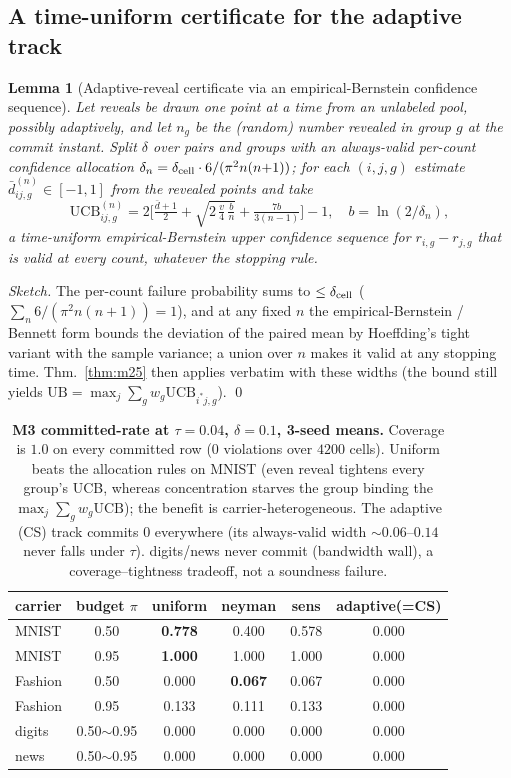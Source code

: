 \documentclass{article}
\newtheorem{lemma}{Lemma}
\begin{document}
\subsection{A time-uniform certificate for the adaptive track}
\begin{lemma}[Adaptive-reveal certificate via an empirical-Bernstein confidence sequence]
\label{lem:cs}
Let reveals be drawn one point at a time from an unlabeled pool, possibly adaptively, and let
$n_g$ be the (random) number revealed in group $g$ at the commit instant. Split $\delta$
over pairs and groups with an always-valid per-count confidence allocation
$\delta_n = \delta_{\rm cell}\cdot 6/(\pi^2 n(n{+}1))$; for each $(i,j,g)$ estimate
$\bar d_{ij,g}^{(n)}\in[-1,1]$ from the revealed points and take
\[
  \mathrm{UCB}^{(n)}_{ij,g} = 2\Big[\tfrac{\bar d+1}{2}+\sqrt{2\,\tfrac{v}{4}\,\tfrac{b}{n}}
    + \tfrac{7b}{3(n-1)}\Big]-1,\quad b=\ln(2/\delta_n),
\]
a time-uniform empirical-Bernstein upper confidence sequence for $r_{i,g}-r_{j,g}$ that is
valid \emph{at every count, whatever the stopping rule}.
\end{lemma}
\begin{proof}[Sketch]
The per-count failure probability sums to $\le \delta_{\rm cell}$
($\sum_n 6/(\pi^2 n(n{+}1))=1$), and at any fixed $n$ the empirical-Bernstein / Bennett form
bounds the deviation of the paired mean by Hoeffding's tight variant with the sample
variance; a union over $n$ makes it valid at any stopping time. Thm.~\ref{thm:m25} then
applies verbatim with these widths (the bound still yields
$\mathrm{UB}=\max_j\sum_g w_g\mathrm{UCB}_{i^*j,g}$). \qed
\end{proof}

\begin{table}[t]
\centering\small\setlength{\tabcolsep}{5pt}
\begin{tabular}{lccccc}
\toprule
carrier & budget $\pi$ & uniform & neyman & sens & adaptive(=CS) \\
\midrule
MNIST & 0.50 & \textbf{0.778} & 0.400 & 0.578 & 0.000 \\
MNIST & 0.95 & \textbf{1.000} & 1.000 & 1.000 & 0.000 \\
Fashion & 0.50 & 0.000 & \textbf{0.067} & 0.067 & 0.000 \\
Fashion & 0.95 & 0.133 & 0.111 & 0.133 & 0.000 \\
digits & 0.50$\sim$0.95 & 0.000 & 0.000 & 0.000 & 0.000 \\
news & 0.50$\sim$0.95 & 0.000 & 0.000 & 0.000 & 0.000 \\
\bottomrule
\end{tabular}
\caption{\textbf{M3 committed-rate at $\tau{=}0.04$, $\delta{=}0.1$, 3-seed means.} Coverage
is $1.0$ on every committed row (0 violations over $4200$ cells). Uniform beats the allocation
rules on MNIST (even reveal tightens every group's UCB, whereas concentration starves the
group binding the $\max_j\sum_g w_g\mathrm{UCB}$); the benefit is carrier-heterogeneous.
The adaptive (CS) track commits $0$ everywhere (its always-valid width $\sim0.06$--$0.14$
never falls under $\tau$). digits/news never commit (bandwidth wall), a coverage--tightness
tradeoff, not a soundness failure.}
\label{tab:m3}
\end{table}
\end{document}

